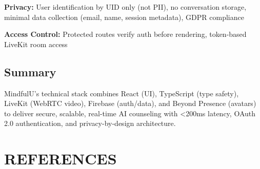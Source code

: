 \documentclass[11pt,a4paper]{report}
\begin{document}
\textbf{Privacy:} User identification by UID only (not PII), no conversation storage, minimal data collection (email, name, session metadata), GDPR compliance

\textbf{Access Control:} Protected routes verify auth before rendering, token-based LiveKit room access

\section{Summary}
MindfulU's technical stack combines React (UI), TypeScript (type safety), LiveKit (WebRTC video), Firebase (auth/data), and Beyond Presence (avatars) to deliver secure, scalable, real-time AI counseling with <200ms latency, OAuth 2.0 authentication, and privacy-by-design architecture.

\chapter{REFERENCES}
\end{document}

